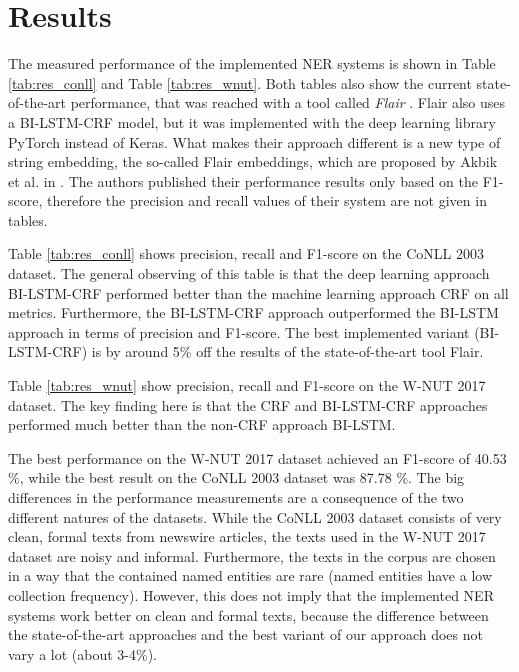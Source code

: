 \documentclass[12pt]{book}
\begin{document}
	\section{Results}
	\label{sec:results}
	
	The measured performance of the implemented NER systems is shown in Table \ref{tab:res_conll} and Table \ref{tab:res_wnut}. Both tables also show the current state-of-the-art performance, that was reached with a tool called \textit{Flair} \cite{akbik2019flair}. Flair also uses a BI-LSTM-CRF model, but it was implemented with the deep learning library PyTorch \cite{pytorch} instead of Keras. What makes their approach different is a new type of string embedding, the so-called Flair embeddings, which are proposed by Akbik et al. in \cite{akbik2018contextual}. The authors published their performance results only based on the F1-score, therefore the precision and recall values of their system are not given in tables.
	
	Table \ref{tab:res_conll} shows precision, recall and F1-score on the CoNLL 2003 dataset. The general observing of this table is that the deep learning approach BI-LSTM-CRF performed better than the machine learning approach CRF on all metrics. Furthermore, the BI-LSTM-CRF approach outperformed the BI-LSTM approach in terms of precision and F1-score. The best implemented variant (BI-LSTM-CRF) is by around 5\% off the results of the state-of-the-art tool Flair.
	
	Table \ref{tab:res_wnut} show precision, recall and F1-score on the W-NUT 2017 dataset. The key finding here is that the CRF and BI-LSTM-CRF approaches performed much better than the non-CRF approach BI-LSTM.
	
	The best performance on the W-NUT 2017 dataset achieved an F1-score of 40.53 \%, while the best result on the CoNLL 2003 dataset was 87.78 \%. The big differences in the performance measurements are a consequence of the two different natures of the datasets. While the CoNLL 2003 dataset consists of very clean, formal texts from newswire articles, the texts used in the W-NUT 2017 dataset are noisy and informal. Furthermore, the texts in the corpus are chosen in a way that the contained named entities are rare (named entities have a low collection frequency). However, this does not imply that the implemented NER systems work better on clean and formal texts, because the difference between the state-of-the-art approaches and the best variant of our approach does not vary a lot (about 3-4\%).
	
\end{document}
